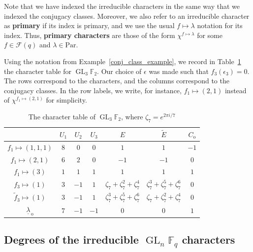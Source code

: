 \documentclass[Unicode,ALCO]{cedram}
\DeclareMathOperator{\GL}{GL}
\newcommand{\F}{\mathbb{F}}
\newcommand{\CF}{\mathcal{F}}
\newcommand{\eps}{\epsilon}
\newcommand{\myemph}{\textbf}
\newcommand{\Par}{\text{Par}}
\newcommand{\ulambda}{{\underline{\lambda}}}
\begin{document}
Note that we have indexed the irreducible characters in the same way that we indexed the conjugacy classes.
Moreover, we also refer to an irreducible character as \myemph{primary} if its index is primary, and we use the usual \(f \mapsto \lambda\) notation for its index.
Thus, \myemph{primary characters} are those of the form \(\chi^{f \mapsto \lambda}\) for some \(f \in \CF (q)\) and \(\lambda \in \Par\).

\begin{example}
\label{runningexample}
Using the notation from Example~\ref{conj_class_example}, we record in Table~\ref{GL3F2_char_table} the character table for $\GL_3 \F_2$.
Our choice of \(\eps\) was made such that \(f_3(\eps_3) = 0\).
The rows correspond to the characters, and the columns correspond to the conjugacy classes.
In the row labels, we write, for instance, $f_1 \mapsto (2,1)$ instead of $\chi^{f_1 \mapsto (2,1)}$ for simplicity.

\begin{table}[ht]
\caption{The character table of \(\GL_3 \F_2\), where $\zeta_7 = e^{2 \pi i / 7}$}
\centering
\begin{tabular}{ c || c | c | c | c | c | c }
 & $U_1$ & $U_2$ & $U_3$ & $E$ & $\tilde{E}$ & $C_{\mathrm{o}}$ \\ \hline \hline
$f_1 \mapsto (1,1,1)$ & $8$ & $0$ & $0$ & $1$ & $1$ & $-1$  \\
$f_1 \mapsto (2,1)$ & $6$ & $2$ & $0$ & $-1$ & $-1$ & $0$ \\
$f_1 \mapsto (3)$ & $1$ & $1$ & $1$ & $1$ & $1$ & $1$ \\
$f_3 \mapsto (1)$ & $3$ & $-1$ & $1$ & $\zeta_7 + \zeta_7^2 + \zeta_7^4$ & $\zeta_7^3 + \zeta_7^5 + \zeta_7^6$ & $0$  \\
$\tilde{f}_3 \mapsto (1)$ & $3$ & $-1$ & $1$ & $\zeta_7^3 + \zeta_7^5 + \zeta_7^6$ & $\zeta_7 + \zeta_7^2 + \zeta_7^4$ & $0$  \\
$\ulambda_{\,\mathrm{o}}$ & $7$ & $-1$ & $-1$ & $0$ & $0$ & $1$  \\
\end{tabular}
\label{GL3F2_char_table}
\end{table}
\end{example}









\subsection{Degrees of the irreducible \texorpdfstring{$\GL_n \F_q$}{GLn Fq} characters}
\end{document}

